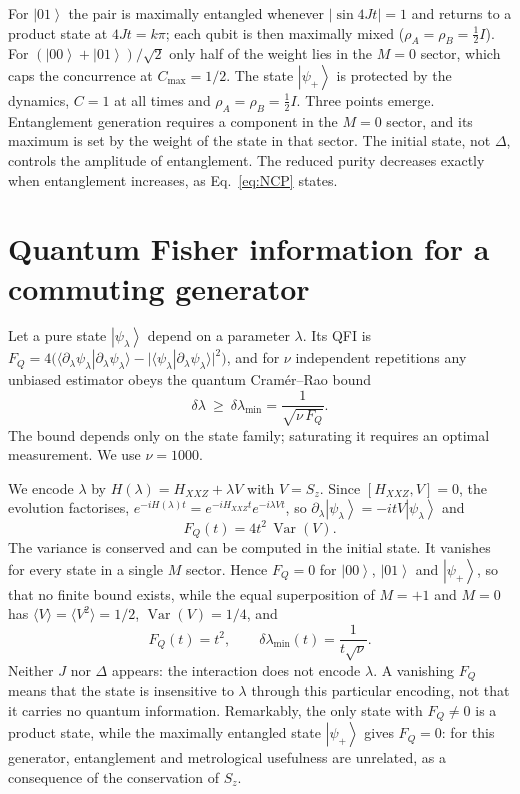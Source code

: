 \documentclass[10.5pt,a4paper]{article}
\newcommand{\ket}[1]{\left|#1\right\rangle}
\newcommand{\Var}{\operatorname{Var}}
\newcommand{\FQ}{F_Q}
\begin{document}
For $\ket{01}$ the pair is maximally entangled whenever $\lvert\sin4Jt\rvert=1$ and returns to a product state at $4Jt=k\pi$; each qubit is then maximally mixed ($\rho_A=\rho_B=\tfrac12I$). For $(\ket{00}+\ket{01})/\sqrt2$ only half of the weight lies in the $M=0$ sector, which caps the concurrence at $C_{\max}=1/2$. The state $\ket{\psi_+}$ is protected by the dynamics, $C=1$ at all times and $\rho_A=\rho_B=\tfrac12 I$. Three points emerge. Entanglement generation requires a component in the $M=0$ sector, and its maximum is set by the weight of the state in that sector. The initial state, not $\Delta$, controls the amplitude of entanglement. The reduced purity decreases exactly when entanglement increases, as Eq.~\eqref{eq:NCP} states.

\section{Quantum Fisher information for a commuting generator}\label{sec:comm}

Let a pure state $\ket{\psi_\lambda}$ depend on a parameter $\lambda$. Its QFI is $\FQ=4\bigl(\langle\partial_\lambda\psi_\lambda|\partial_\lambda\psi_\lambda\rangle-\lvert\langle\psi_\lambda|\partial_\lambda\psi_\lambda\rangle\rvert^2\bigr)$, and for $\nu$ independent repetitions any unbiased estimator obeys the quantum Cram\'er--Rao bound \cite{BraunsteinCaves1994,Giovannetti2011}
\begin{equation}
  \delta\lambda\ \ge\ \delta\lambda_{\min}=\frac{1}{\sqrt{\nu\,\FQ}}.
\end{equation}
The bound depends only on the state family; saturating it requires an optimal measurement. We use $\nu=1000$.

We encode $\lambda$ by $H(\lambda)=H_{XXZ}+\lambda V$ with $V=S_z$. Since $[H_{XXZ},V]=0$, the evolution factorises, $e^{-iH(\lambda)t}=e^{-iH_{XXZ}t}e^{-i\lambda Vt}$, so $\partial_\lambda\ket{\psi_\lambda}=-itV\ket{\psi_\lambda}$ and
\begin{equation}
  \FQ(t)=4t^2\,\Var(V).
  \label{eq:FQ}
\end{equation}
The variance is conserved and can be computed in the initial state. It vanishes for every state in a single $M$ sector. Hence $\FQ=0$ for $\ket{00}$, $\ket{01}$ and $\ket{\psi_+}$, so that no finite bound exists, while the equal superposition of $M=+1$ and $M=0$ has $\langle V\rangle=\langle V^2\rangle=1/2$, $\Var(V)=1/4$, and
\begin{equation}
  \FQ(t)=t^2,\qquad \delta\lambda_{\min}(t)=\frac{1}{t\sqrt\nu}.
\end{equation}
Neither $J$ nor $\Delta$ appears: the interaction does not encode $\lambda$. A vanishing $\FQ$ means that the state is insensitive to $\lambda$ through this particular encoding, not that it carries no quantum information. Remarkably, the only state with $\FQ\neq0$ is a product state, while the maximally entangled state $\ket{\psi_+}$ gives $\FQ=0$: for this generator, entanglement and metrological usefulness are unrelated, as a consequence of the conservation of $S_z$.
\end{document}
